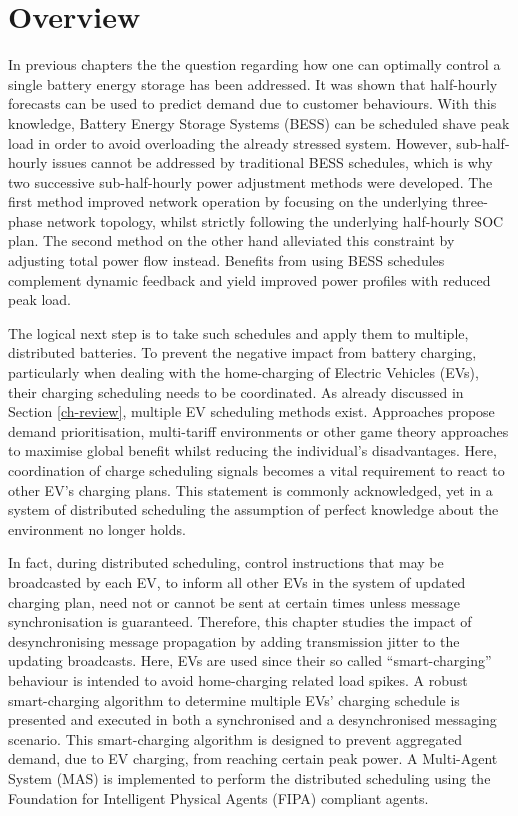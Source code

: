 \section{Overview}
\label{ch3:sec:overview}

In previous chapters the the question regarding how one can optimally control a single battery energy storage has been addressed.
It was shown that half-hourly forecasts can be used to predict demand due to customer behaviours.
With this knowledge, Battery Energy Storage Systems (BESS) can be scheduled shave peak load in order to avoid overloading the already stressed system.
However, sub-half-hourly issues cannot be addressed by traditional BESS schedules, which is why two successive sub-half-hourly power adjustment methods were developed.
The first method improved network operation by focusing on the underlying three-phase network topology, whilst strictly following the underlying half-hourly SOC plan.
The second method on the other hand alleviated this constraint by adjusting total power flow instead.
Benefits from using BESS schedules complement dynamic feedback and yield improved power profiles with reduced peak load.

The logical next step is to take such schedules and apply them to multiple, distributed batteries.
To prevent the negative impact from battery charging, particularly when dealing with the home-charging of Electric Vehicles (EVs), their charging scheduling needs to be coordinated.
As already discussed in Section \ref{ch-review}, multiple EV scheduling methods exist.
Approaches propose demand prioritisation, multi-tariff environments or other game theory approaches to maximise global benefit whilst reducing the individual's disadvantages.
Here, coordination of charge scheduling signals becomes a vital requirement to react to other EV's charging plans.
This statement is commonly acknowledged, yet in a system of distributed scheduling the assumption of perfect knowledge about the environment no longer holds.

In fact, during distributed scheduling, control instructions that may be broadcasted by each EV, to inform all other EVs in the system of updated charging plan, need not or cannot be sent at certain times unless message synchronisation is guaranteed.
Therefore, this chapter studies the impact of desynchronising message propagation by adding transmission jitter to the updating broadcasts.
Here, EVs are used since their so called ``smart-charging'' behaviour is intended to avoid home-charging related load spikes.
A robust smart-charging algorithm to determine multiple EVs' charging schedule is presented and executed in both a synchronised and a desynchronised messaging scenario.
This smart-charging algorithm is designed to prevent aggregated demand, due to EV charging, from reaching certain peak power.
A Multi-Agent System (MAS) is implemented to perform the distributed scheduling using the Foundation for Intelligent Physical Agents (FIPA) compliant agents.

